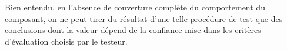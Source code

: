 Bien entendu, en l'absence de couverture compl\`ete du comportement
du composant, on ne peut tirer du r\'esultat d'une telle proc\'edure
de test que des conclusions dont la valeur d\'epend de la confiance
mise dans les crit\`eres d'\'evaluation choisis par le testeur.





